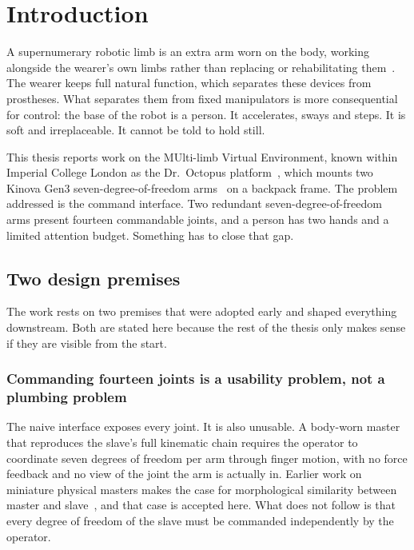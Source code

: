 \chapter{Introduction}
\label{ch:intro}

A supernumerary robotic limb is an extra arm worn on the body, working
alongside the wearer's own limbs rather than replacing or rehabilitating
them~\cite{yang2021srlreview,prattichizzo2021augmentation}. The wearer keeps
full natural function, which separates these devices from prostheses. What
separates them from fixed manipulators is more consequential for control: the
base of the robot is a person. It accelerates, sways and steps. It is soft and
irreplaceable. It cannot be told to hold still.

This thesis reports work on the MUlti-limb Virtual Environment, known within
Imperial College London as the Dr.\ Octopus platform~\cite{muve}, which mounts
two Kinova Gen3 seven-degree-of-freedom arms~\cite{kinova2022gen3} on a
backpack frame. The problem addressed is the command interface. Two redundant
seven-degree-of-freedom arms present fourteen commandable joints, and a person
has two hands and a limited attention budget. Something has to close that gap.

\section{Two design premises}

The work rests on two premises that were adopted early and shaped everything
downstream. Both are stated here because the rest of the thesis only makes
sense if they are visible from the start.

\subsection{Commanding fourteen joints is a usability problem, not a
plumbing problem}

The naive interface exposes every joint. It is also unusable. A body-worn
master that reproduces the slave's full kinematic chain requires the operator
to coordinate seven degrees of freedom per arm through finger motion, with no
force feedback and no view of the joint the arm is actually in. Earlier work
on miniature physical masters makes the case for morphological similarity
between master and slave~\cite{guggenheim2021haptic}, and that case is
accepted here. What does not follow is that every degree of freedom of the
slave must be commanded independently by the operator.

